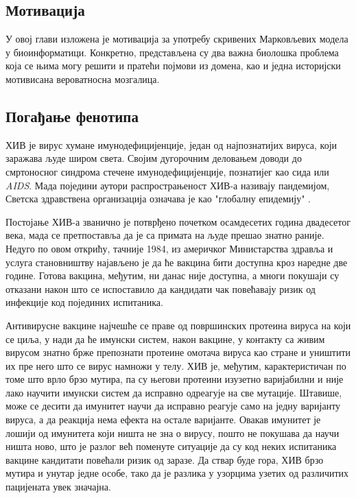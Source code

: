 \documentclass[12pt,oneside]{memoir}
\begin{document}
\begin{CJK}{UTF8}{ipxm}
\chapter{Мотивација}
У овој глави изложена је мотивација за употребу скривених Марковљевих модела у биоинформатици. Конкретно, представљена су два важна биолошка проблема која се њима могу решити и пратећи појмови из домена, као и једна историјски мотивисана вероватносна мозгалица.

\section{Погађање фенотипа}
ХИВ је вирус хумане имунодефицијенције, један од најпознатијих вируса, који заражава људе широм света. Својим дугорочним деловањем доводи до смртоносног синдрома стечене имунодефицијенције, познатијег као сида или \textit{AIDS}. Мада поједини аутори распрострањеност ХИВ-а називају пандемијом, Светска здравствена организација означава је као "глобалну епидемију" \cite{who}.

Постојање ХИВ-а званично је потврђено почетком осамдесетих година двадесетог века, мада се претпоставља да је са примата на људе прешао знатно раније. Недуго по овом открићу, тачније 1984, из америчког Министарства здравља и услуга становништву најављено је да ће вакцина бити доступна кроз наредне две године. Готова вакцина, међутим, ни данас није доступна, а многи покушаји су отказани након што се испоставило да кандидати чак повећавају ризик од инфекције код појединих испитаника.

Антивирусне вакцине најчешће се праве од површинских протеина вируса на који се циља, у нади да ће имунски систем, након вакцине, у контакту са живим вирусом знатно брже препознати протеине омотача вируса као стране и уништити их пре него што се вирус намножи у телу. ХИВ је, међутим, карактеристичан по томе што врло брзо мутира, па су његови протеини изузетно варијабилни и није лако научити имунски систем да исправно одреагује на све мутације. Штавише, може се десити да имунитет научи да исправно реагује само на једну варијанту вируса, а да реакција нема ефекта на остале варијанте. Овакав имунитет је лошији од имунитета који ништа не зна о вирусу, пошто не покушава да научи ништа ново, што је разлог већ поменуте ситуације да су код неких испитаника вакцине кандитати повећали ризик од заразе. Да ствар буде гора, ХИВ брзо мутира и унутар једне особе, тако да је разлика у узорцима узетих од различитих пацијената увек значајна.


\end{CJK}
\end{document}
